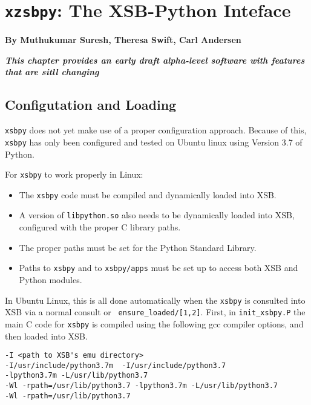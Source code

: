 
\chapter[XSB and Python]{{\tt xzsbpy}: The XSB-Python Inteface}

\begin{center}
  {\Large {\bf By Muthukumar Suresh, Theresa Swift, Carl Andersen}}
\end{center}

\noindent
{\large {\bf {\em This chapter provides an early draft alpha-level
      software with features that are sitll changing}}}

%


\section{Configutation and Loading}

{\tt xsbpy} does not yet make use of a proper configuration approach.
Because of this, {\tt xsbpy} has only been configured and tested on
Ubuntu linux using Version 3.7 of Python.

For {\tt xsbpy} to work properly in Linux:
\begin{itemize}
\item The {\tt xsbpy} code must be compiled and dynamically loaded into XSB.
\item A version of {\tt libpython.so} also needs to be dynamically
  loaded into XSB, configured with the proper C library paths.
\item The proper paths must be set for the Python Standard Library.
\item Paths to {\tt xsbpy} and to {\tt xsbpy/apps} must be set up to
  access both XSB and Python modules.
\end{itemize}

In Ubuntu Linux, this is all done automatically when the {\tt xsbpy}
is consulted into XSB via a normal consult or {\tt
  ensure\_loaded/[1,2]}.  First, in {\tt init\_xsbpy.P} the main C
code for {\tt xsbpy} is compiled using the following gcc compiler
options, and then loaded into XSB.

\begin{verbatim}
-I <path to XSB's emu directory>  
-I/usr/include/python3.7m  -I/usr/include/python3.7  
-lpython3.7m -L/usr/lib/python3.7 
-Wl -rpath=/usr/lib/python3.7 -lpython3.7m -L/usr/lib/python3.7 
-Wl -rpath=/usr/lib/python3.7
\end{verbatim}

